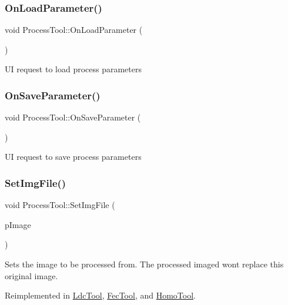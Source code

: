 \subsubsection{\texorpdfstring{On\+Load\+Parameter()}{OnLoadParameter()}}
{\footnotesize\ttfamily void Process\+Tool\+::\+On\+Load\+Parameter (\begin{DoxyParamCaption}{ }\end{DoxyParamCaption})\hspace{0.3cm}{\ttfamily [protected]}}

UI request to load process parameters \mbox{\label{class_process_tool_aff87d429b43cdb20405a5036ec0a4d66}} 
\subsubsection{\texorpdfstring{On\+Save\+Parameter()}{OnSaveParameter()}}
{\footnotesize\ttfamily void Process\+Tool\+::\+On\+Save\+Parameter (\begin{DoxyParamCaption}{ }\end{DoxyParamCaption})\hspace{0.3cm}{\ttfamily [protected]}}

UI request to save process parameters \mbox{\label{class_process_tool_a178bc06abf5a20220bd2306a14708a93}} 
\subsubsection{\texorpdfstring{Set\+Img\+File()}{SetImgFile()}}
{\footnotesize\ttfamily void Process\+Tool\+::\+Set\+Img\+File (\begin{DoxyParamCaption}\item[{Img\+File $\ast$}]{p\+Image }\end{DoxyParamCaption})\hspace{0.3cm}{\ttfamily [virtual]}}

Sets the image to be processed from. The processed imaged won\textquotesingle{}t replace this original image. 

Reimplemented in \mbox{\hyperlink{class_ldc_tool_a07d1a547f02d4dea6a480c1be875a685}{Ldc\+Tool}}, \mbox{\hyperlink{class_fec_tool_ac99805fa120b8bb7a21fc08382a875c1}{Fec\+Tool}}, and \mbox{\hyperlink{class_homo_tool_af43fe8ae0732dffbeb35b59058509af2}{Homo\+Tool}}.

